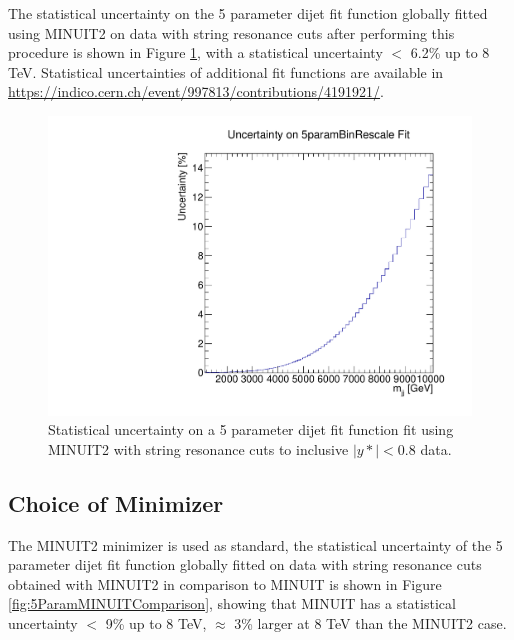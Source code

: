 The statistical uncertainty on the 5 parameter dijet fit function globally fitted using MINUIT2 on data with string resonance cuts after performing this procedure is shown in Figure \ref{fig:5ParamStatisticalUncertainty}, with a statistical uncertainty $ < $ 6.2\% up to 8 TeV. Statistical uncertainties of additional fit functions are available in \\ {\href{https://indico.cern.ch/event/997813/contributions/4191921/attachments/2178521/3679266/dijet_CompareBinRescale_26_01_2021.pdf}{https://indico.cern.ch/event/997813/contributions/4191921/}}.

\begin{figure}
    \centering
    \includegraphics[width=1\linewidth]{figures/app-GlobalFitStudies/5ParamGlobalFit_ystar0p8_Uncertainty.pdf}
    \caption{Statistical uncertainty on a 5 parameter dijet fit function fit using MINUIT2 with string resonance cuts to inclusive $|y*|<0.8$ data.}
    \label{fig:5ParamStatisticalUncertainty}
\end{figure}

\subsection{Choice of Minimizer}
\label{subsec:MinimizerChoice:GlobalFitting}
The MINUIT2 minimizer is used as standard, the statistical uncertainty of the 5 parameter dijet fit function globally fitted on data with string resonance cuts obtained with MINUIT2 in comparison to MINUIT is shown in Figure \ref{fig:5ParamMINUITComparison}, showing that MINUIT has a statistical uncertainty $ < $ 9\% up to 8 TeV, $\approx$ 3\% larger at 8 TeV than the MINUIT2 case.

